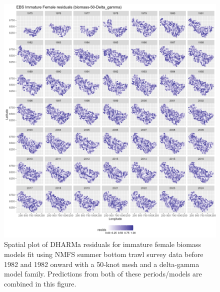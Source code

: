 \documentclass[
]{article}
\begin{document}
\begin{figure}

{\centering \includegraphics[width=1\linewidth,height=1\textheight]{../BAIRDI/Figures/DHARMa_Immature Female_biomass-50-Delta_gamma_SPATIAL} 

}

\caption{Spatial plot of DHARMa residuals for immature female biomass models fit using NMFS summer bottom trawl survey data before 1982 and 1982 onward with a 50-knot mesh and a delta-gamma model family. Predictions from both of these periods/models are combined in this figure.}\label{fig:DHARMa-bio-spat-50-imfem}
\end{figure}
\end{document}
